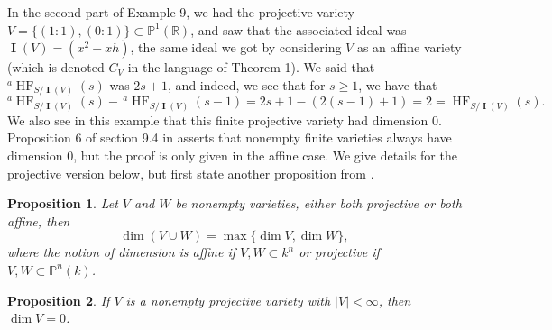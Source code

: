 \documentclass[11pt]{article}
\newcommand{\R}{\mathbb{R}}
\newcommand{\Proj}{\mathbb{P}}
\DeclareMathOperator{\HF}{HF}
\DeclareMathOperator{\I}{\mathbf{I}}
\newtheorem{proposition}{Proposition}
\theoremstyle{definition}
\begin{document}
In the second part of Example 9, we had the projective variety $V = \{(1:1), (0:1)\} \subset \Proj^1(\R)$, and saw that the associated ideal was $\I(V) = (x^2 - xh)$, the same ideal we got by considering $V$ as an affine variety (which is denoted $C_V$ in the language of Theorem 1). We said that $^a\HF_{S/\I(V)}(s)$ was $2s + 1$, and indeed, we see that for $s \geq 1$, we have that \[ ^a\HF_{S/\I(V)}(s) - \, ^a\HF_{S/\I(V)}(s - 1) = 2s + 1 - (2(s - 1) + 1) = 2 = \HF_{S/\I(V)}(s). \] We also see in this example that this finite projective variety had dimension 0. Proposition 6 of section 9.4 in \cite{cox2013ideals} asserts that nonempty finite varieties always have dimension 0, but the proof is only given in the affine case. We give details for the projective version below, but first state another proposition from \cite{cox2013ideals}.


\begin{proposition}
	Let $V$ and $W$ be nonempty varieties, either both projective or both affine, then \[ \dim (V \cup W) = \max\{\dim V, \dim W\}, \] where the notion of dimension is affine if $V,W \subset k^n$ or projective if $V,W \subset \Proj^n(k)$. 
\end{proposition}


\begin{proposition}
	If $V$ is a nonempty projective variety with $|V| < \infty$, then $\dim V = 0$. 
\end{proposition}
\end{document}
